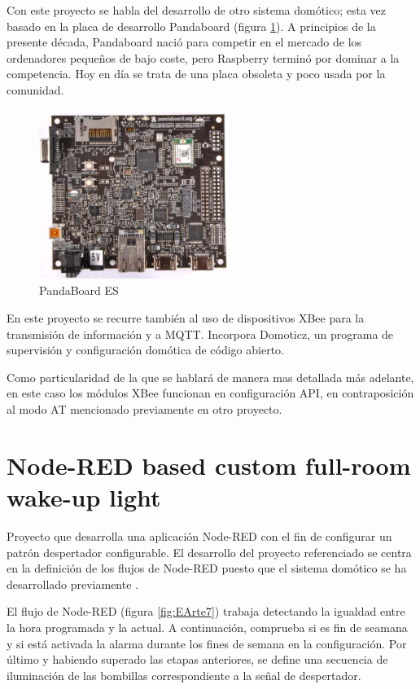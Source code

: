 Con este proyecto se habla del desarrollo de otro sistema domótico; esta vez basado en la placa de desarrollo Pandaboard (figura \ref{fig:EArte6}). A principios de la presente década, Pandaboard nació para competir en el mercado de los ordenadores pequeños de bajo coste, pero Raspberry terminó por dominar a la competencia. Hoy en día se trata de una placa obsoleta y poco usada por la comunidad.

\begin{figure}[tb]
\centering
\includegraphics[width=0.55\textwidth]{figuras/EArte6.png}
\caption{PandaBoard ES}
\label{fig:EArte6}
\end{figure}

En este proyecto se recurre también al uso de dispositivos XBee para la transmisión de información y a MQTT. Incorpora Domoticz, un programa de supervisión y configuración domótica de código abierto.

Como particularidad de la que se hablará de manera mas detallada más adelante, en este caso los módulos XBee funcionan en configuración API, en contraposición al modo AT mencionado previamente en otro proyecto.

\section{Node-RED based custom full-room wake-up light \cite{Bulten:2019}}

Proyecto que desarrolla una aplicación Node-RED con el fin de configurar un patrón despertador configurable. El desarrollo del proyecto referenciado \cite{Bulten:2019} se centra en la definición de los flujos de Node-RED puesto que el sistema domótico se ha desarrollado previamente \cite{Bulten:2018}.

El flujo de Node-RED (figura \ref{fig:EArte7}) trabaja detectando la igualdad entre la hora programada y la actual. A continuación, comprueba si es fin de seamana y si está activada la alarma durante los fines de semana en la configuración. Por último y habiendo superado las etapas anteriores, se define una secuencia de iluminación de las bombillas correspondiente a la señal de despertador.

